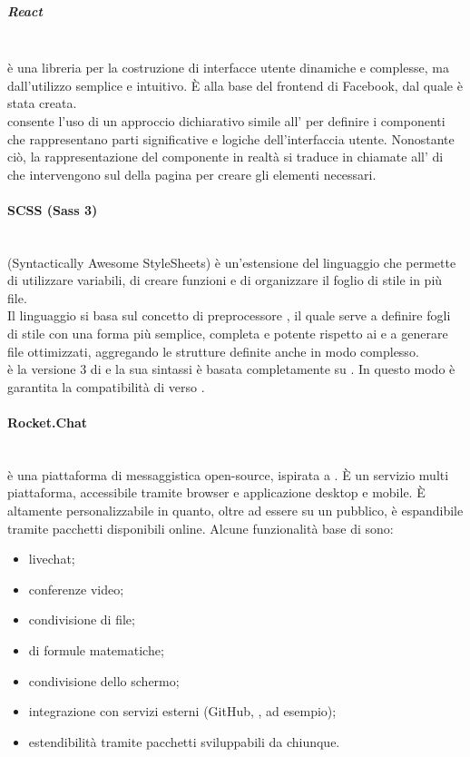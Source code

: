 \subparagraph{React}\mbox{}\\
 è una libreria  per la costruzione di interfacce utente dinamiche e complesse, ma dall'utilizzo semplice e intuitivo. \`{E} alla base del frontend di Facebook, dal quale è stata creata.\\
 consente l'uso di un approccio dichiarativo simile all' per definire i componenti che rappresentano parti significative e logiche dell'interfaccia utente. Nonostante ciò, la rappresentazione del componente in realtà si traduce in chiamate all' di  che intervengono sul  della pagina per creare gli elementi necessari.

\paragraph{SCSS (Sass 3)}\mbox{}\\
 (Syntactically Awesome StyleSheets) è un'estensione del linguaggio  che permette di utilizzare variabili, di creare funzioni e di organizzare il foglio di stile in più file.\\
Il linguaggio  si basa sul concetto di preprocessore , il quale serve a definire fogli di stile con una forma più semplice, completa e potente rispetto ai  e a generare file  ottimizzati, aggregando le strutture definite anche in modo complesso.\\
 è la versione 3 di  e la sua sintassi è basata completamente su . In questo modo è garantita la compatibilità di  verso .

\paragraph{Rocket.Chat}\mbox{}\\
 è una piattaforma di messaggistica open-source, ispirata a . \`{E} un servizio multi piattaforma, accessibile tramite browser e applicazione desktop e mobile. \`{E} altamente personalizzabile in quanto, oltre ad essere su un  pubblico, è espandibile tramite pacchetti disponibili online. Alcune funzionalità base di  sono:
\begin{itemize}
	\item livechat;
	\item conferenze video;
	\item condivisione di file;
	\item {} di formule matematiche;
	\item condivisione dello schermo;
	\item integrazione con servizi esterni (GitHub, ,  ad esempio);
	\item estendibilità tramite pacchetti sviluppabili da chiunque.
\end{itemize}

